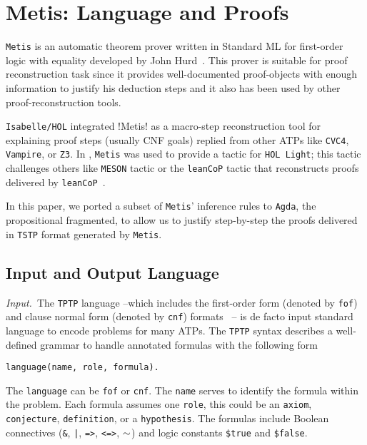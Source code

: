 \documentclass[../main.tex]{subfiles}
\begin{document}

\section{Metis: Language and Proofs}
\label{sec:metis-language-and-proofs}

\verb!Metis! is an automatic theorem prover written in Standard ML for
first-order logic with equality developed by John Hurd~\cite{hurd2003first}.
This prover is suitable for proof reconstruction task since it provides
well-documented proof-objects with enough information to justify his deduction
steps and it also has been used by other proof-reconstruction tools.

\verb!Isabelle/HOL! integrated !Metis! as a macro-step reconstruction
tool for explaining proof steps (usually CNF goals) replied from other ATPs like
\verb!CVC4!, \verb!Vampire!, or \verb!Z3!.
In \cite{Farber2015}, \verb!Metis! was used to provide a tactic for
\verb!HOL Light!; this tactic challenges others like \verb!MESON! tactic or the
\verb!leanCoP! tactic that reconstructs proofs delivered by
\verb!leanCoP!~\cite{Farber2016}.

In this paper, we ported a subset of \verb!Metis!' inference rules to \verb!Agda!,
the propositional fragmented, to allow us to justify step-by-step the proofs
delivered in \verb!TSTP! format generated by \verb!Metis!.


\subsection{Input and Output Language}
\label{ssec:input-and-output-language}

\textit{Input.}~The \verb!TPTP! language  --which includes the first-order
form (denoted by \verb!fof!) and clause normal form (denoted by \verb!cnf!)
formats~\cite{sutcliffe2009} -- is de
facto input standard language to encode problems for many ATPs.
The \verb!TPTP! syntax describes a well-defined grammar to handle annotated
formulas with the following form

\begin{verbatim}
language(name, role, formula).
\end{verbatim}

The \verb!language! can be \verb!fof! or \verb!cnf!. The \verb!name!
serves to identify the formula within the problem. Each formula assumes one
\verb!role!, this could be an \verb!axiom!, \verb!conjecture!,
\verb!definition!, or a \verb!hypothesis!. The formulas include Boolean
connectives (\verb!&!, \verb!|!, \verb!=>!, \verb!<=>!, $\tt\sim$) and logic
constants \verb!$true! and \verb!$false!.
\end{document}
